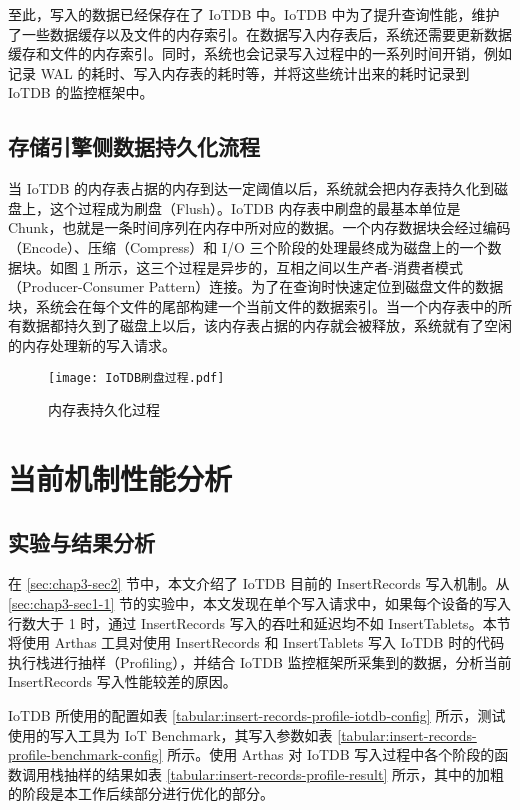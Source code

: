 至此，写入的数据已经保存在了 IoTDB 中。IoTDB 中为了提升查询性能，维护了一些数据缓存以及文件的内存索引。在数据写入内存表后，系统还需要更新数据缓存和文件的内存索引。同时，系统也会记录写入过程中的一系列时间开销，例如记录 WAL 的耗时、写入内存表的耗时等，并将这些统计出来的耗时记录到 IoTDB 的监控框架中。
\subsection{存储引擎侧数据持久化流程}
当 IoTDB 的内存表占据的内存到达一定阈值以后，系统就会把内存表持久化到磁盘上，这个过程成为刷盘（Flush）。IoTDB 内存表中刷盘的最基本单位是 Chunk，也就是一条时间序列在内存中所对应的数据。一个内存数据块会经过编码（Encode）、压缩（Compress）和 I/O 三个阶段的处理最终成为磁盘上的一个数据块。如图 \ref{fig:memtable-flush} 所示，这三个过程是异步的，互相之间以生产者-消费者模式（Producer-Consumer Pattern）连接。为了在查询时快速定位到磁盘文件的数据块，系统会在每个文件的尾部构建一个当前文件的数据索引。当一个内存表中的所有数据都持久到了磁盘上以后，该内存表占据的内存就会被释放，系统就有了空闲的内存处理新的写入请求。

\begin{figure}
  \centering
  \texttt{[image: IoTDB刷盘过程.pdf]}
  \caption{内存表持久化过程}
  \label{fig:memtable-flush}
\end{figure}

\section{当前机制性能分析}
\subsection{实验与结果分析\label{sec:chap3-sec3-1}}
在 \ref{sec:chap3-sec2} 节中，本文介绍了 IoTDB 目前的 InsertRecords 写入机制。从 \ref{sec:chap3-sec1-1} 节的实验中，本文发现在单个写入请求中，如果每个设备的写入行数大于 1 时，通过 InsertRecords 写入的吞吐和延迟均不如 InsertTablets。本节将使用 Arthas 工具对使用 InsertRecords 和 InsertTablets 写入 IoTDB 时的代码执行栈进行抽样（Profiling），并结合 IoTDB 监控框架所采集到的数据，分析当前 InsertRecords 写入性能较差的原因。

IoTDB 所使用的配置如表 \ref{tabular:insert-records-profile-iotdb-config} 所示，测试使用的写入工具为 IoT Benchmark\cite{liu2019benchmarking}，其写入参数如表 \ref{tabular:insert-records-profile-benchmark-config} 所示。使用 Arthas 对 IoTDB 写入过程中各个阶段的函数调用栈抽样的结果如表 \ref{tabular:insert-records-profile-result} 所示，其中的加粗的阶段是本工作后续部分进行优化的部分。

